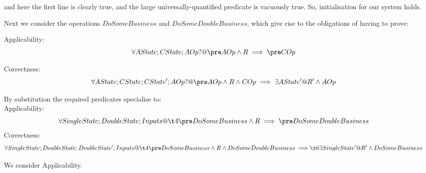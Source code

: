 \documentclass[11pt]{amsart}
\begin{document}
\noindent and here the first line is clearly true, and the large universally-quantified predicate is vacuously true. So, initialisation for our system holds.

Next we consider the operations $DoSomeBusiness$ and $DoSomeDoubleBusiness$, which give rise to the obligations of having to prove:

\noindent Applicability:
\[
\forall AState; CState; AOp? @ \pre AOp \land R \implies \pre COp
\]

\noindent Correctness:
\[
\forall AState; CState; CState'; AOp? @ \pre AOp \land R \land COp \implies \exists AState' @ R' \land AOp
\]

By substitution the required predicates specialise to:\\

\noindent Applicability:
\[
\forall SingleState; DoubleState; Inputs @\\
\t4 \pre DoSomeBusiness \land R \implies \pre DoSomeDoubleBusiness
\]
\noindent Correctness:
\[
\forall SingleState; DoubleState; DoubleState'; Inputs @\\
\t4  \pre DoSomeBusiness \land R \land DoSomeDoubleBusiness \implies \\
\t6 \exists SingleState' @ R' \land DoSomeBusiness
\]

We consider Applicability.
\end{document}
